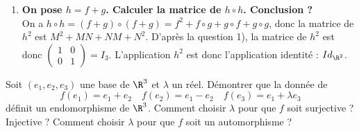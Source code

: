 \documentclass[a4paper, 11pt,reqno]{article}
\begin{document}
\begin{correction}
\begin{enumerate}
		      On sait que $\dim \im f = 1$, et que $\im f$ est engendr\'e par les colonnes de $M$, soit $\im f = \vect ((2,1),(-4,-2))$. Il suffit donc de choisir un vecteur non nul parmi les deux colonnes pour avoir une base de $\im f$. On a ainsi .\\
		      On sait que $\im g$ est engendr\'e par les colonnes de $N$, soit $\im f = \vect ((0,0),(1,0)) = \vect((1,0))$. Donc $((1,0))$ est une famille g\'en\'eratrice et libre de $\im g$, donc .
		\item \textbf{On pose $h=f+g$. Calculer la matrice de $h\circ h$. Conclusion ?}\\
		      On a $h\circ h = (f+g)\circ (f+g) = f^2+f\circ g + g \circ f + g \circ g$, donc la matrice de $h^2$ est $M^2+MN+NM+N^2$. D'apr\`es la question 1), la matrice de $h^2$ est donc $\left(\begin{array}{rr} 1&0\\0&1 \end{array}\right) = I_3$. L'application $h^2$ est donc l'application identit\'e : $Id_{\R^2}$.
	\end{enumerate}
\end{correction}
\begin{exercice}  \;
	Soit $(e_1,e_2,e_3)$ une base de $\R^3$ et $\lambda$ un r\'eel. D\'emontrer que la donn\'ee de
	$$f(e_1)=e_1+e_2\quad f(e_2)=e_1-e_2\quad f(e_3)=e_1+\lambda e_3$$
	d\'efinit un endomorphisme de $\R^3$. Comment choisir $\lambda$ pour que $f$ soit surjective ? Injective ? Comment choisir $\lambda$ pour que $f$ soit un automorphisme ?
\end{exercice}
\end{document}
